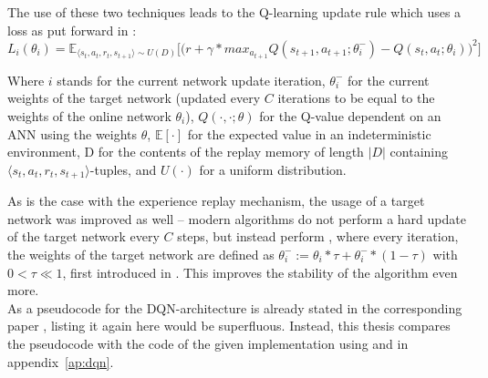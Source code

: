 \noindent The use of these two techniques leads to the Q-learning update rule which uses a loss as put forward in \cite{mnih_human-level_2015}:
\begin{equation} \label{qloss_target}
	L_i(\theta_i) = \mathds{E}_{\langle s_t,a_t,r_t,s_{t+1} \rangle \sim U(D)} \Bigg[\Big( r + \gamma * max_{a_{t+1}} Q(s_{t+1}, a_{t+1}; \theta^-_i) - Q(s_t,a_t;\theta_i) \Big)^2\Bigg]
\end{equation}
\begin{flushright}
	\scriptsize
	Where $i$ stands for the current network update iteration, $\theta_i^-$ for the current weights of the target network (updated every $C$ iterations to be equal to the weights of the online network $\theta_i$), $Q(\cdot,\cdot;\theta)$ for the Q-value dependent on an ANN using the weights $\theta$, $\mathds{E}[\cdot]$ for the expected value in an indeterministic environment, D for the contents of the replay memory of length $\lvert D \rvert$ containing $\langle s_t,a_t,r_t,s_{t+1} \rangle$-tuples, and $U(\cdot)$ for a uniform distribution.
\end{flushright}
As is the case with the experience replay mechanism, the usage of a target network was improved as well -- modern algorithms do not perform a hard update of the target network every $C$ steps, but instead perform , where every iteration, the weights of the target network are defined as $\theta^-_i := \theta_i * \tau + \theta^-_i * (1-\tau)$ with $0 < \tau \ll 1$, first introduced in \cite{lillicrap_continuous_2015}. This improves the stability of the algorithm even more.\\

As a pseudocode for the DQN-architecture is already stated in the corresponding paper \cite{mnih_human-level_2015}, listing it again here would be superfluous. Instead, this thesis compares the pseudocode with the code of the given implementation using  and  in appendix~\ref{ap:dqn}. 

